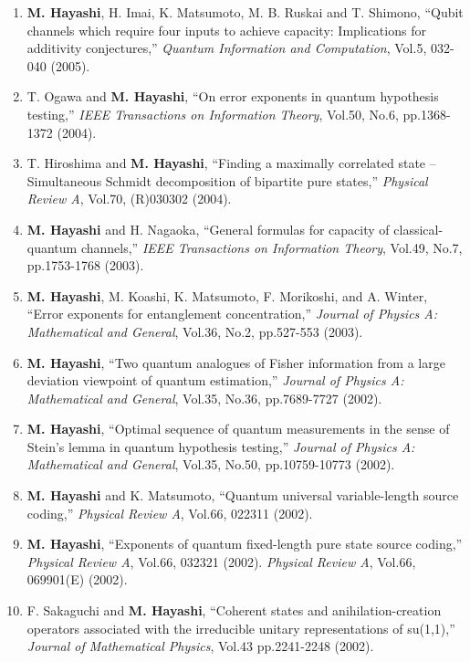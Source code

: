 \documentclass[a4paper,12pt,oneside]{article}
\begin{document}
\begin{enumerate}
\item
\textbf{M. Hayashi}, H. Imai, K. Matsumoto, M. B. Ruskai and T. Shimono, 
``Qubit channels which require four inputs to achieve capacity: Implications for additivity conjectures,'' 
{\em Quantum Information and Computation}, Vol.5, 032-040 (2005).

\item
T. Ogawa and \textbf{M. Hayashi}, 
``On error exponents in quantum hypothesis testing,'' 
{\em IEEE Transactions on Information Theory}, Vol.50, No.6, pp.1368-1372 (2004).

\item
T. Hiroshima and \textbf{M. Hayashi}, ``Finding a maximally correlated state -- Simultaneous Schmidt decomposition of bipartite pure states,'' 
{\em Physical Review A}, Vol.70, (R)030302 (2004).

\item
\textbf{M. Hayashi} and H. Nagaoka, ``General formulas for capacity of classical-quantum channels,'' 
{\em IEEE Transactions on Information Theory}, Vol.49, No.7, pp.1753-1768 (2003).

\item
\textbf{M. Hayashi}, M. Koashi, K. Matsumoto, F. Morikoshi, and A. Winter, 
``Error exponents for entanglement concentration,'' 
{\em Journal of Physics A: Mathematical and General}, Vol.36, No.2, pp.527-553 (2003). 

\item
\textbf{M. Hayashi}, ``Two quantum analogues of Fisher information from a large deviation viewpoint of quantum estimation,'' 
{\em Journal of Physics A: Mathematical and General}, Vol.35, No.36, pp.7689-7727 (2002).

\item
\textbf{M. Hayashi}, ``Optimal sequence of quantum measurements in the sense of Stein's lemma in quantum hypothesis testing,'' 
{\em Journal of Physics A: Mathematical and General}, Vol.35, No.50, pp.10759-10773 (2002).

\item
\textbf{M. Hayashi} and K. Matsumoto, ``Quantum universal variable-length source coding,'' 
{\em Physical Review A}, Vol.66, 022311 (2002). 

\item
\textbf{M. Hayashi}, ``Exponents of quantum fixed-length pure state source coding,'' 
{\em Physical Review A}, Vol.66, 032321 (2002). 
{\em Physical Review A}, Vol.66, 069901(E) (2002).

\item
F. Sakaguchi and \textbf{M. Hayashi}, ``Coherent states and anihilation-creation operators associated with the irreducible unitary representations of su(1,1),'' 
{\em Journal of Mathematical Physics}, Vol.43 pp.2241-2248 (2002).


\end{enumerate}
\end{document}
